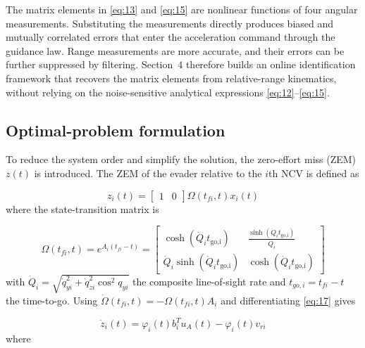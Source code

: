 \begin{assumption}
The matrix elements in \eqref{eq:13} and \eqref{eq:15} are nonlinear functions of four angular measurements. Substituting the measurements directly produces biased and mutually correlated errors that enter the acceleration command through the guidance law. Range measurements are more accurate, and their errors can be further suppressed by filtering. Section~4 therefore builds an online identification framework that recovers the matrix elements from relative-range kinematics, without relying on the noise-sensitive analytical expressions \eqref{eq:12}--\eqref{eq:15}.
\end{assumption}

\subsection{Optimal-problem formulation}
To reduce the system order and simplify the solution, the zero-effort miss (ZEM) $z(t)$ is introduced. The ZEM of the evader relative to the $i$th NCV is defined as

\begin{equation}
\label{eq:17}
{z_i}(t) = \left[ {\begin{array}{*{20}{c}}
  1&0 
\end{array}} \right]\Omega \left( {{t_{fi}},t} \right){x_i}(t)
\end{equation}
where the state-transition matrix is

\begin{equation}
\label{eq:18}
\Omega \left( {{t_{fi}},t} \right) = {e^{{A_i}\left( {{t_{fi}} - t} \right)}} = \left[ {\begin{array}{*{20}{c}}
  {\cosh ({{\dot Q}_i}{t_{{\text{go,i}}}})}&{\frac{{\sinh ({{\dot Q}_i}{t_{{\text{go,i}}}})}}{{{{\dot Q}_i}}}} \\ 
  {{{\dot Q}_i}\sinh ({{\dot Q}_i}{t_{{\text{go,i}}}})}&{\cosh ({{\dot Q}_i}{t_{{\text{go,i}}}})} 
\end{array}} \right]
\end{equation}
with ${\dot Q_i} = \sqrt {\dot q_{yi}^2 + \dot q_{zi}^2{{\cos }^2}{q_{yi}}} $ the composite line-of-sight rate and ${t_{go,i}} = {t_{fi}} - t$ the time-to-go. Using $\dot \Omega \left( {{t_{fi}},t} \right) =  - \Omega \left( {{t_{fi}},t} \right){A_i}$ and differentiating \eqref{eq:17} gives

\begin{equation}
\label{eq:19}
{\dot z_i}(t) = {\varphi _i}(t)b_i^T{u_A}(t) - {\varphi _i}(t){v_{ri}}
\end{equation}
where

